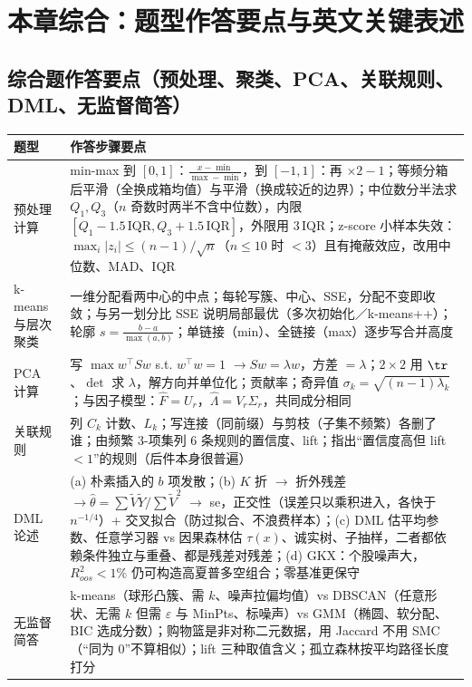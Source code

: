 \section{本章综合：题型作答要点与英文关键表述}

\subsection{综合题作答要点（预处理、聚类、PCA、关联规则、DML、无监督简答）}
\begin{center}\small
\begin{tabularx}{\linewidth}{@{}p{2.5cm}L@{}}
\toprule
题型 & 作答步骤要点\\
\midrule
预处理计算 & min-max 到 $[0,1]$：$\frac{x-\min}{\max-\min}$，到 $[-1,1]$：再 $\times2-1$；等频分箱后平滑（全换成箱均值）与平滑（换成较近的边界）；中位数分半法求 $Q_1,Q_3$（$n$ 奇数时两半不含中位数），内限 $[Q_1-1.5\,\mathrm{IQR},Q_3+1.5\,\mathrm{IQR}]$，外限用 $3\,\mathrm{IQR}$；z-score 小样本失效：$\max_i|z_i|\le(n-1)/\sqrt n$（$n\le10$ 时 $<3$）且有掩蔽效应，改用中位数、MAD、IQR\\
k-means 与层次聚类 & 一维分配看两中心的中点；每轮写簇、中心、SSE，分配不变即收敛；与另一划分比 SSE 说明局部最优（多次初始化／k-means++）；轮廓 $s=\frac{b-a}{\max(a,b)}$；单链接（min）、全链接（max）逐步写合并高度\\
PCA 计算 & 写 $\max w^\top Sw$ s.t. $w^\top w=1$ $\to Sw=\lambda w$，方差 $=\lambda$；$2\times2$ 用 $\tr$、$\det$ 求 $\lambda$，解方向并单位化；贡献率；奇异值 $\sigma_k=\sqrt{(n-1)\lambda_k}$；与因子模型：$\hat F=U_r$，$\hat\Lambda=V_r\Sigma_r$，共同成分相同\\
关联规则 & 列 $C_k$ 计数、$L_k$；写连接（同前缀）与剪枝（子集不频繁）各删了谁；由频繁 3-项集列 6 条规则的置信度、lift；指出“置信度高但 lift $<1$”的规则（后件本身很普遍）\\
DML 论述 & (a) 朴素插入的 $b$ 项发散；(b) $K$ 折 $\to$ 折外残差 $\to\hat\theta=\sum\tilde V\tilde Y/\sum\tilde V^2$ $\to$ se，正交性（误差只以乘积进入，各快于 $n^{-1/4}$）+ 交叉拟合（防过拟合、不浪费样本）；(c) DML 估平均参数、任意学习器 vs 因果森林估 $\tau(x)$、诚实树、子抽样，二者都依赖条件独立与重叠、都是残差对残差；(d) GKX：个股噪声大，$R^2_{oos}<1\%$ 仍可构造高夏普多空组合；零基准更保守\\
无监督简答 & k-means（球形凸簇、需 $k$、噪声拉偏均值）vs DBSCAN（任意形状、无需 $k$ 但需 $\varepsilon$ 与 MinPts、标噪声）vs GMM（椭圆、软分配、BIC 选成分数）；购物篮是非对称二元数据，用 Jaccard 不用 SMC（“同为 0”不算相似）；lift 三种取值含义；孤立森林按平均路径长度打分\\
\bottomrule
\end{tabularx}
\end{center}

